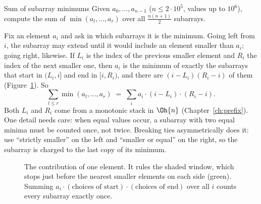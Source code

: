 \begin{problem}{Sum of subarray minimums}
Given $a_0, \dots, a_{n-1}$ ($n \le 2\cdot10^5$, values up to $10^6$), compute the sum of $\min(a_l, \dots, a_r)$ over all
$\frac{n(n+1)}{2}$ subarrays.
\end{problem}

Fix an element $a_i$ and ask in which subarrays it is the minimum. Going left from $i$, the subarray may extend until it
would include an element smaller than $a_i$; going right, likewise. If $L_i$ is the index of the previous smaller element and
$R_i$ the index of the next smaller one, then $a_i$ is the minimum of exactly the subarrays that start in $(L_i, i]$ and end in
$[i, R_i)$, and there are $(i - L_i)(R_i - i)$ of them (Figure~\ref{fig:contribution}). So
\[
  \sum_{l \le r} \min(a_l, \dots, a_r) \;=\; \sum_{i} a_i \cdot (i - L_i)\cdot(R_i - i).
\]
Both $L_i$ and $R_i$ come from a monotonic stack in $\Oh{n}$ (Chapter~\ref{ch:prefix}). One detail needs care: when equal
values occur, a subarray with two equal minima must be counted once, not twice. Breaking ties asymmetrically does it: use
``strictly smaller'' on the left and ``smaller or equal'' on the right, so the subarray is charged to the last copy of its
minimum.

\begin{figure}[htbp]
\centering
{}
\caption{The contribution of one element. It rules the shaded window, which stops just before the nearest smaller
elements on each side (green). Summing $a_i \cdot (\text{choices of start}) \cdot (\text{choices of end})$ over all $i$
counts every subarray exactly once.}
\label{fig:contribution}
\end{figure}


